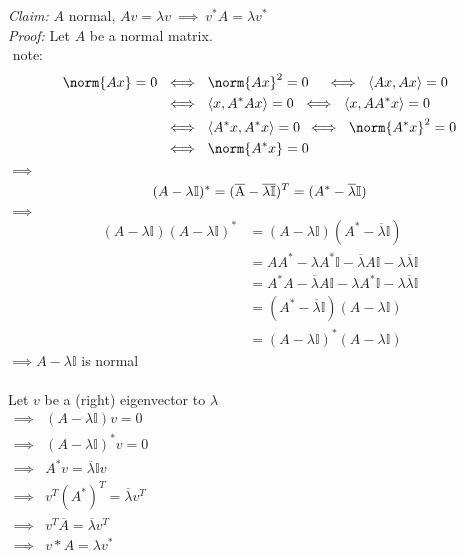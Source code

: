 \begin{SolutionSheet}[\ref{sheet2}]
  \begin{Solution}
    \textit{Claim:} $A$ normal, $Av = \lambda v \ 
      \implies \ v^* A = \lambda v^*$ \\
    \textit{Proof:} Let $A$ be a normal matrix. \\
    $ $ note: \begin{equation*}
      \begin{split}
        \norm{Ax} = 0 \ &\iff \ \norm{Ax}^2 = 0 \quad 
          \iff \ \langle Ax,Ax \rangle = 0 \\
          &\iff \ \langle x, A^*Ax \rangle = 0 \ 
          \iff \ \langle x, AA^*x \rangle = 0 \\
          &\iff \  \langle A^*x,A^*x\rangle = 0 \: 
          \iff \ \norm{A^*x}^2 = 0 \\
          &\iff \ \norm{A^*x} = 0
      \end{split}
    \end{equation*}
    $\implies$ \begin{equation*}
      (A - \lambda \mathbb{I})^* 
        = (\overline{\rm A} - \overline{\rm \lambda \mathbb{I}})^T 
        = (A^* - \overline{\lambda} \mathbb{I}) 
    \end{equation*}
    $ \implies$ \begin{align*} 
      (A - \lambda \mathbb{I})(A - \lambda \mathbb{I})^* &= (A - \lambda \mathbb{I})(A^* - \overline{\lambda} \mathbb{I}) \\
      &= AA^* - \lambda A^*\mathbb{I} - \overline{\lambda} A \mathbb{I} - \lambda \overline{\lambda} \mathbb{I} \\
      &= A^*A - \overline{\lambda} A \mathbb{I} - \lambda A^*\mathbb{I} - \lambda \overline{\lambda} \mathbb{I} \\
      &= (A^* - \overline{\lambda} \mathbb{I})(A - \lambda \mathbb{I}) \\
      &= (A - \lambda \mathbb{I})^* (A - \lambda \mathbb{I})
    \end{align*}
    $ \implies A - \lambda \mathbb{I}$ is normal\\
    \\
    Let $v$ be a (right) eigenvector to $\lambda$ \\
    $\begin{array}{ll}      
      \implies &(A- \lambda \mathbb{I})v = 0 \\
      \implies &(A- \lambda \mathbb{I})^*v = 0 \\
      \implies &A^*v = \overline{\lambda} \mathbb{I}v \\
      \implies &v^T(A^*)^T = \overline{\lambda} v^T \\
      \implies &v^T \overline{A} = \overline{\lambda} v^T \\
      \implies &v*A = \lambda v^*
    \end{array}$


\end{Solution}
\end{SolutionSheet}
